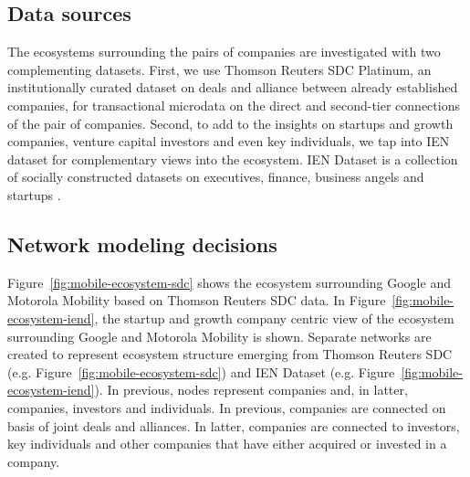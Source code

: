 \subsection{Data sources}

The ecosystems surrounding the pairs of companies are investigated with two complementing datasets. First, we use Thomson Reuters SDC Platinum, an institutionally curated dataset on deals and alliance between already established companies, for transactional microdata on the direct and second-tier connections of the pair of companies. Second, to add to the insights on startups and growth companies, venture capital investors and even key individuals, we tap into IEN dataset for complementary views into the ecosystem. IEN Dataset is a collection of socially constructed datasets on executives, finance, business angels and startups \citep{Rubens2010LeveragingMoves}.

\subsection{Network modeling decisions}

Figure~\ref{fig:mobile-ecosystem-sdc} shows the ecosystem surrounding Google and Motorola Mobility based on Thomson Reuters SDC data. In Figure~\ref{fig:mobile-ecosystem-iend}, the startup and growth company centric view of the ecosystem surrounding Google and Motorola Mobility is shown. Separate networks are created to represent ecosystem structure emerging from Thomson Reuters SDC (e.g. Figure~\ref{fig:mobile-ecosystem-sdc}) and IEN Dataset (e.g. Figure~\ref{fig:mobile-ecosystem-iend}). In previous, nodes represent companies and, in latter, companies, investors and individuals. In previous, companies are connected on basis of joint deals and alliances. In latter, companies are connected to investors, key individuals and other companies that have either acquired or invested in a company. 

